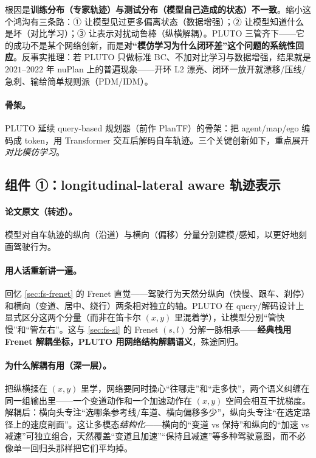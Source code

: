 \begin{insight}
根因是\textbf{训练分布（专家轨迹）与测试分布（模型自己造成的状态）不一致}。缩小这个鸿沟有三条路：① 让模型见过更多偏离状态（数据增强）；② 让模型知道什么是坏（对比学习）；③ 让表示对扰动鲁棒（纵横解耦）。PLUTO 三管齐下——它的成功不是某个网络创新，而是\textbf{对“模仿学习为什么闭环差”这个问题的系统性回应}。反事实推理：若 PLUTO 只做标准 BC、不加对比学习与数据增强，结果就是 $2021$--$2022$ 年 nuPlan 上的普遍现象——开环 L2 漂亮、闭环一放开就漂移/压线/急刹、输给简单规则派（PDM/IDM）。
\end{insight}

\paragraph{骨架。}
PLUTO 延续 query-based 规划器（前作 PlanTF）的骨架：把 agent/map/ego 编码成 token，用 Transformer 交互后解码自车轨迹。三个关键创新如下，重点展开\emph{对比模仿学习}。

\subsection{组件 ①：longitudinal-lateral aware 轨迹表示}
\label{sec:de-lonlat}

\paragraph{论文原文（转述）。}
模型对自车轨迹的纵向（沿道）与横向（偏移）分量分别建模/感知，以更好地刻画驾驶行为\cite{cheng2024pluto}。

\paragraph{用人话重新讲一遍。}
回忆 \cref{sec:fs-frenet} 的 Frenet 直觉——驾驶行为天然分纵向（快慢、跟车、刹停）和横向（变道、居中、绕行）两条相对独立的轴。PLUTO 在 query/解码设计上显式区分这两个分量（而非在笛卡尔 $(x,y)$ 里混着学），让模型分别“管快慢”和“管左右”。这与 \cref{sec:fs-sl} 的 Frenet $(s,l)$ 分解一脉相承——\textbf{经典栈用 Frenet 解耦坐标，PLUTO 用网络结构解耦语义}，殊途同归。

\paragraph{为什么解耦有用（深一层）。}
把纵横揉在 $(x,y)$ 里学，网络要同时操心“往哪走”和“走多快”，两个语义纠缠在同一组输出里——一个变道动作和一个加速动作在 $(x,y)$ 空间会相互干扰梯度。解耦后：横向头专注“选哪条参考线/车道、横向偏移多少”，纵向头专注“在选定路径上的速度剖面”。这让多模态\emph{结构化}——横向的“变道 vs 保持”和纵向的“加速 vs 减速”可独立组合，天然覆盖“变道且加速”“保持且减速”等多种驾驶意图，而不必像单一回归头那样把它们平均掉。

